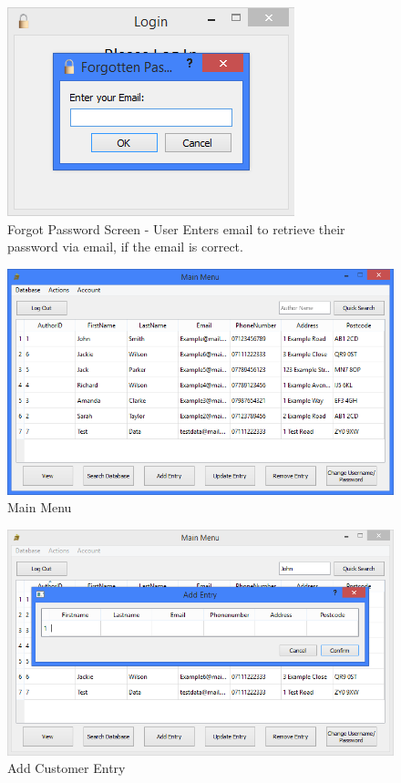 \begin{figure}[H]
    \caption{Forgot Password Screen - User Enters email to retrieve their password via email, if the email is correct.} \label{fig:ForgotPasswordScreen}
    \includegraphics[width=\textwidth]{./Maintenance/UserInterface/ForgotPasswordScreen.png}
\end{figure}

\begin{figure}[H]
    \caption{Main Menu} \label{fig:MainMenu}
    \includegraphics[width=\textwidth]{./Maintenance/UserInterface/MainMenu.png}
\end{figure}

\begin{figure}[H]
    \caption{Add Customer Entry} \label{fig:AddEntry}
    \includegraphics[width=\textwidth]{./Maintenance/UserInterface/AddEntry.png}
\end{figure}

